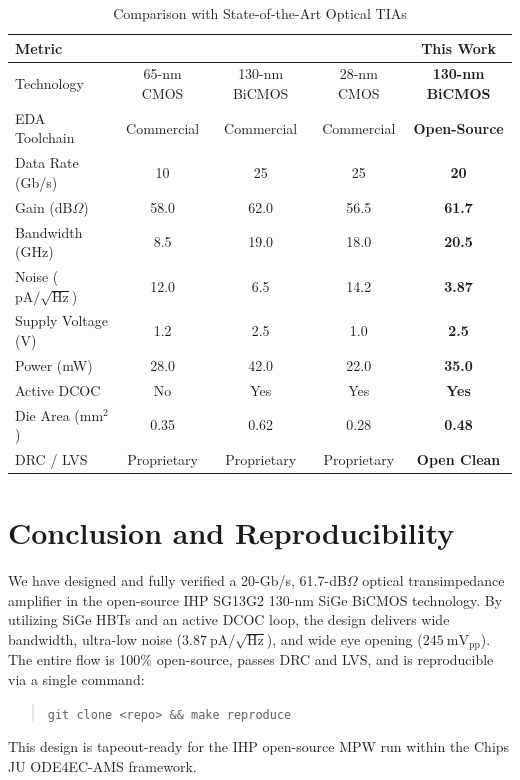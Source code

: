 \documentclass[conference]{IEEEtran}
\begin{document}
\begin{table}[t]
\caption{Comparison with State-of-the-Art Optical TIAs}
\label{tab:comparison}
\centering
\begin{tabular}{lcccc}
\toprule
\textbf{Metric} & \textbf{\cite{ref_jssc1}} & \textbf{\cite{ref_tcas1}} & \textbf{\cite{ref_isscc1}} & \textbf{This Work} \\
\midrule
Technology & 65-nm CMOS & 130-nm BiCMOS & 28-nm CMOS & \textbf{130-nm BiCMOS} \\
EDA Toolchain & Commercial & Commercial & Commercial & \textbf{Open-Source} \\
Data Rate (Gb/s) & 10 & 25 & 25 & \textbf{20} \\
Gain ($\text{dB}\Omega$) & 58.0 & 62.0 & 56.5 & \textbf{61.7} \\
Bandwidth (GHz) & 8.5 & 19.0 & 18.0 & \textbf{20.5} \\
Noise ($\text{pA}/\sqrt{\text{Hz}}$) & 12.0 & 6.5 & 14.2 & \textbf{3.87} \\
Supply Voltage (V) & 1.2 & 2.5 & 1.0 & \textbf{2.5} \\
Power (mW) & 28.0 & 42.0 & 22.0 & \textbf{35.0} \\
Active DCOC & No & Yes & Yes & \textbf{Yes} \\
Die Area ($\text{mm}^2$) & 0.35 & 0.62 & 0.28 & \textbf{0.48} \\
DRC / LVS & Proprietary & Proprietary & Proprietary & \textbf{Open Clean} \\
\bottomrule
\end{tabular}
\end{table}

\section{Conclusion and Reproducibility}
We have designed and fully verified a 20-Gb/s, 61.7-dB$\Omega$ optical transimpedance amplifier in the open-source IHP SG13G2 130-nm SiGe BiCMOS technology. By utilizing SiGe HBTs and an active DCOC loop, the design delivers wide bandwidth, ultra-low noise ($3.87~\text{pA}/\sqrt{\text{Hz}}$), and wide eye opening ($245~\text{mV}_{\text{pp}}$). The entire flow is 100\% open-source, passes DRC and LVS, and is reproducible via a single command:
\begin{quote}
\texttt{git clone <repo> \&\& make reproduce}
\end{quote}
This design is tapeout-ready for the IHP open-source MPW run within the Chips JU ODE4EC-AMS framework.
\end{document}
